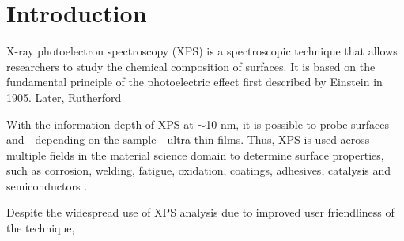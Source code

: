 



\chapter{Introduction} %
\label{Chapter1} %


\newcommand{\keyword}[1]{\textbf{#1}}
\newcommand{\tabhead}[1]{\textbf{#1}}
\newcommand{\code}[1]{\texttt{#1}}
\newcommand{\file}[1]{\texttt{\bfseries#1}}
\newcommand{\option}[1]{\texttt{\itshape#1}}




X-ray photoelectron spectroscopy (XPS) is a spectroscopic technique that allows researchers to study the chemical composition of surfaces. It is based on the fundamental principle of the photoelectric effect first described by Einstein \cite{einstein_uber_1905} in 1905. Later, Rutherford 

With the information depth of XPS at $\sim$10 nm, it is possible to probe surfaces and - depending on the sample - ultra thin films.
Thus, XPS is used across multiple fields in the material science domain to determine surface properties, such as corrosion, welding, fatigue, oxidation, coatings, adhesives, catalysis and semiconductors \cite{noauthor_x-ray_nodate}.


Despite the widespread use of XPS analysis due to improved user friendliness of the technique, 








